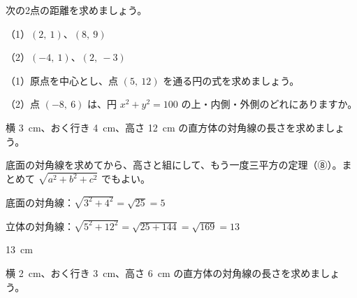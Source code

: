 \noindent\begin{minipage}[t]{0.485\linewidth}\vspace{0pt}\raggedright
\begin{jibun}\raggedright
次の2点の距離を求めましょう。\par（1）$(2,\ 1)$、$(8,\ 9)$\par（2）$(-4,\ 1)$、$(2,\ -3)$
\end{jibun}
\end{minipage}\hfill
\begin{minipage}[t]{0.485\linewidth}\vspace{0pt}\raggedright
\begin{jibun}\raggedright
（1）原点を中心とし、点 $(5,\ 12)$ を通る円の式を求めましょう。\par
（2）点 $(-8,\ 6)$ は、円 $x^2+y^2=100$ の上・内側・外側のどれにありますか。
\end{jibun}
\end{minipage}

\begin{reidai}[直方体の対角線]
横 \qty{3}{cm}、おく行き \qty{4}{cm}、高さ \qty{12}{cm} の直方体の対角線の長さを求めましょう。\par
\kangaekata 底面の対角線を求めてから、高さと組にして、もう一度三平方の定理（⑧）。まとめて $\sqrt{a^2+b^2+c^2}$ でもよい。\par
\shiki 底面の対角線：$\sqrt{3^2+4^2}=\sqrt{25}=5$\par
\hspace*{2.6\zw}立体の対角線：$\sqrt{5^2+12^2}=\sqrt{25+144}=\sqrt{169}=13$\par
\kotae \qty{13}{cm}
\end{reidai}

\begin{jibun}
横 \qty{2}{cm}、おく行き \qty{3}{cm}、高さ \qty{6}{cm} の直方体の対角線の長さを求めましょう。
\end{jibun}

